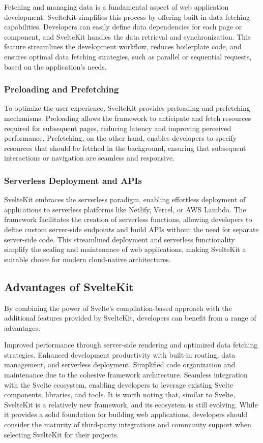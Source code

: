 Fetching and managing data is a fundamental aspect of web application development. SvelteKit simplifies this process by offering built-in data fetching capabilities. Developers can easily define data dependencies for each page or component, and SvelteKit handles the data retrieval and synchronization. This feature streamlines the development workflow, reduces boilerplate code, and ensures optimal data fetching strategies, such as parallel or sequential requests, based on the application's needs.

\subsubsection{Preloading and Prefetching}

To optimize the user experience, SvelteKit provides preloading and prefetching mechanisms. Preloading allows the framework to anticipate and fetch resources required for subsequent pages, reducing latency and improving perceived performance. Prefetching, on the other hand, enables developers to specify resources that should be fetched in the background, ensuring that subsequent interactions or navigation are seamless and responsive.

\subsubsection{Serverless Deployment and APIs}

SvelteKit embraces the serverless paradigm, enabling effortless deployment of applications to serverless platforms like Netlify, Vercel, or AWS Lambda. The framework facilitates the creation of serverless functions, allowing developers to define custom server-side endpoints and build APIs without the need for separate server-side code. This streamlined deployment and serverless functionality simplify the scaling and maintenance of web applications, making SvelteKit a suitable choice for modern cloud-native architectures.

\subsection{Advantages of SvelteKit}

By combining the power of Svelte's compilation-based approach with the additional features provided by SvelteKit, developers can benefit from a range of advantages:

Improved performance through server-side rendering and optimized data fetching strategies.
Enhanced development productivity with built-in routing, data management, and serverless deployment.
Simplified code organization and maintenance due to the cohesive framework architecture.
Seamless integration with the Svelte ecosystem, enabling developers to leverage existing Svelte components, libraries, and tools.
It is worth noting that, similar to Svelte, SvelteKit is a relatively new framework, and its ecosystem is still evolving. While it provides a solid foundation for building web applications, developers should consider the maturity of third-party integrations and community support when selecting SvelteKit for their projects.

